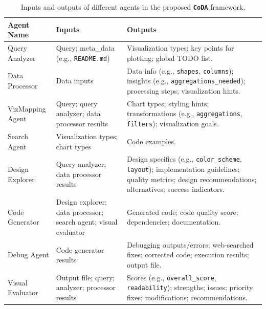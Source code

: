 \documentclass[11pt, a4paper, logo, copyright]{googlecloud}
\newcommand{\methodname}{\textbf{\texttt{\textcolor{StarIndigo}{C}\textcolor{StarIndigo}{o}\textcolor{StarCoral}{D}\textcolor{StarTeal}{A}}}}
\newcommand{\io}[1]{\setlength{\fboxsep}{1pt}\colorbox{gray!10}{\texttt{#1}}}
\begin{document}
\begin{table}[htbp]
\centering
\caption{Inputs and outputs of different agents in the proposed \methodname{} framework.}
\label{tab:agent_roles}
\footnotesize
\setlength{\tabcolsep}{5pt}
\renewcommand{\arraystretch}{1.3}
\begin{tabular}{p{2.8cm} p{4.5cm} p{8.2cm}}
\toprule
\rowcolor{gray!20}
\textbf{Agent Name} & \textbf{Inputs} & \textbf{Outputs} \\
\midrule
Query Analyzer & Query; meta\_data (e.g., \io{README.md}) & Visualization types; key points for plotting; global TODO list. \\
Data Processor & Data inputs & Data info (e.g., \io{shapes}, \io{columns}); insights (e.g., \io{aggregations\_needed}); processing steps; visualization hints. \\
VizMapping Agent & Query; query analyzer; data processor results & Chart types; styling hints; transformations (e.g., \io{aggregations}, \io{filters}); visualization goals. \\
Search Agent & Visualization types; chart types & Code examples. \\
Design Explorer & Query analyzer; data processor results & Design specifics (e.g., \io{color\_scheme}, \io{layout}); implementation guidelines; quality metrics; design recommendations; alternatives; success indicators. \\
Code Generator & Design explorer; data processor; search agent; visual evaluator & Generated code; code quality score; dependencies; documentation. \\
Debug Agent & Code generator results & Debugging outputs/errors; web-searched fixes; corrected code; execution results; output file. \\
Visual Evaluator & Output file; query; analyzer; processor results & Scores (e.g., \io{overall\_score}, \io{readability}); strengths; issues; priority fixes; modifications; recommendations. \\
\bottomrule
\end{tabular}
\end{table}
\end{document}
